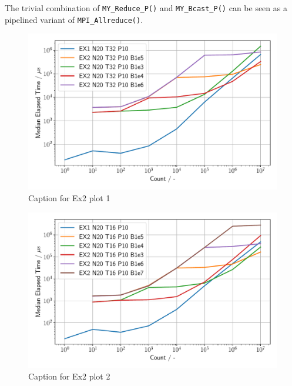 The trivial combination of \texttt{MY\_Reduce\_P()} and \texttt{MY\_Bcast\_P()} can be seen as a pipelined variant 
of \texttt{MPI\_Allreduce()}.\\

\begin{figure}[h]
\begin{center}
    \includegraphics[width=1.0\linewidth]{figures/Ex2_1.pdf}
    \caption{Caption for Ex2 plot 1}
    \label{Ex2_1_p}
\end{center}
\end{figure}

\begin{figure}[h]
\begin{center}
    \includegraphics[width=1.0\linewidth]{figures/Ex2_2.pdf}
    \caption{Caption for Ex2 plot 2}
    \label{Ex2_2_p}
\end{center}
\end{figure}


